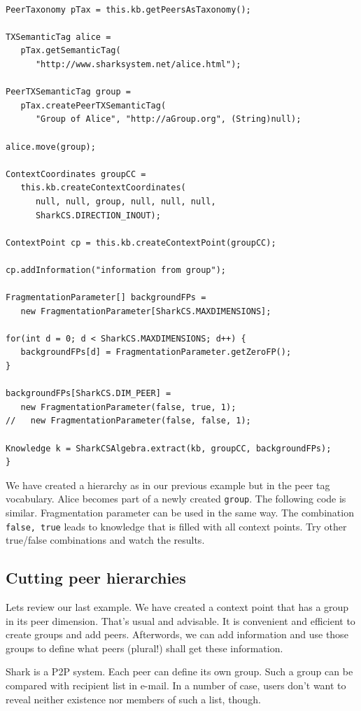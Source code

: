 \begin{verbatim}

PeerTaxonomy pTax = this.kb.getPeersAsTaxonomy();

TXSemanticTag alice = 
   pTax.getSemanticTag(
      "http://www.sharksystem.net/alice.html");

PeerTXSemanticTag group = 
   pTax.createPeerTXSemanticTag(
      "Group of Alice", "http://aGroup.org", (String)null);

alice.move(group);

ContextCoordinates groupCC = 
   this.kb.createContextCoordinates(
      null, null, group, null, null, null, 
      SharkCS.DIRECTION_INOUT);

ContextPoint cp = this.kb.createContextPoint(groupCC);

cp.addInformation("information from group");

FragmentationParameter[] backgroundFPs =
   new FragmentationParameter[SharkCS.MAXDIMENSIONS];

for(int d = 0; d < SharkCS.MAXDIMENSIONS; d++) {
   backgroundFPs[d] = FragmentationParameter.getZeroFP();
}

backgroundFPs[SharkCS.DIM_PEER] = 
   new FragmentationParameter(false, true, 1);
//   new FragmentationParameter(false, false, 1);

Knowledge k = SharkCSAlgebra.extract(kb, groupCC, backgroundFPs);
}
\end{verbatim}

We have created a hierarchy as in our previous example but in the peer tag vocabulary.
Alice becomes part of a newly created {\tt group}. The following code is similar. Fragmentation parameter can be used in the same way. The combination 
{\tt false, true} leads to knowledge that is filled with all context points. Try other true/false combinations and watch the results.

\subsection{Cutting peer hierarchies}
Lets review our last example. We have created a context point that has a group in its peer dimension. That's usual and advisable. It is convenient and efficient to create groups and add peers. Afterwords, we can add information and use those groups to define what peers (plural!) shall get these information.

Shark is a P2P system. Each peer can define its own group. Such a group can be compared with recipient list in e-mail. In a number of case, users don't want to reveal neither existence nor members of such a list, though.

